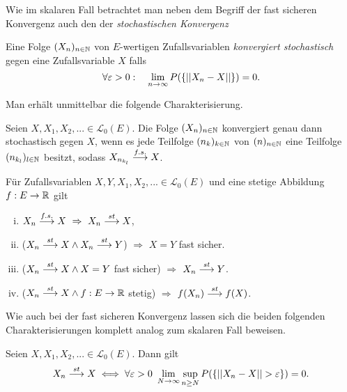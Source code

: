 Wie im skalaren Fall betrachtet man neben dem Begriff der fast sicheren Konvergenz auch den der \textit{stochastischen Konvergenz}

\begin{mydef}
    Eine Folge $(X_n)_{n \in \mathbb{N}}$ von $E$-wertigen Zufallsvariablen \textit{konvergiert stochastisch} gegen eine Zufallsvariable $X$ falls
    $$
        \forall \varepsilon > 0: \quad \lim_{n \to \infty}P(\{ \lvert \lvert X_n - X  \rvert \rvert\}) = 0. 
    $$      
\end{mydef}

Man erhält unmittelbar die folgende Charakterisierung. 

\begin{theorem}[Teilfolgenkriterium]
    Seien $X,X_1,X_2,... \in \mathcal{L}_0(E)$. Die Folge $(X_n)_{n \in \mathbb{N}}$ konvergiert genau dann stochastisch gegen $X$, 
    wenn es jede Teilfolge $(n_k)_{k \in \mathbb{N}}$ von $(n)_{n \in \mathbb{N}}$ eine Teilfolge $(n_{k_l})_{l \in \mathbb{N}}$ besitzt, sodass $X_{n_{k_l}} \overset{f.s.}{\longrightarrow} X$.  
\end{theorem}

\begin{corollary}
    Für Zufallsvariablen $X,Y, X_1, X_2,... \in \mathcal{L}_0(E)$ und eine stetige Abbildung $f:E \to \mathbb{R}$ gilt
    \begin{enumerate}[(i)]
        \item $X_n \overset{f.s.}{\longrightarrow} X \ \Rightarrow \ X_n \overset{st}{\longrightarrow} X$,
        \item ($X_n \overset{st}{\longrightarrow} X \land X_n \overset{st}{\longrightarrow} Y$) $\Rightarrow$ $ X = Y$ fast sicher. 
        \item ($X_n \overset{st}{\longrightarrow} X \land X = Y$ fast sicher) $\Rightarrow$ $X_n \overset{st}{\longrightarrow} Y$. 
        \item ($X_n \overset{st}{\longrightarrow} X \land f:E \to \mathbb{R}$ stetig) $\Rightarrow$ $f(X_n) \overset{st}{\longrightarrow} f(X)$. 
    \end{enumerate}
\end{corollary}

Wie auch bei der fast sicheren Konvergenz lassen sich die beiden folgenden Charakterisierungen komplett analog zum skalaren Fall beweisen. 

\begin{theorem}
    Seien $X, X_1,X_2,... \in \mathcal{L}_0(E)$. Dann gilt
    \begin{align*}
        X_n \overset{st}{\longrightarrow} X \iff \forall \varepsilon > 0 \ \lim_{N \to \infty}\sup_{n \geq N}P(\{\lvert \lvert X_n - X \rvert \rvert > \varepsilon \}) = 0.
    \end{align*}
\end{theorem}

